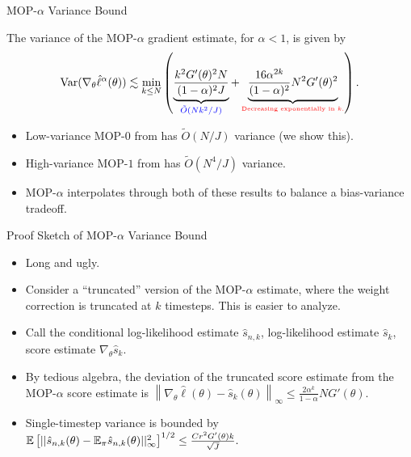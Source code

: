 \documentclass{beamer}
\begin{document}
\begin{frame}{MOP-$\alpha$ Variance Bound}
    \begin{thm}
        The variance of the MOP-$\alpha$ gradient estimate, for $\alpha<1$, is given by
        \pause
        $$\text{Var}(\nabla_\theta \hat\ell^\alpha(\theta)) \lesssim \min_{k\leq N} \left(\underbrace{\frac{k^2G'(\theta)^2N}{(1-\alpha)^2J}}_{\textcolor{blue}{\tilde O(Nk^2/J)}} + \underbrace{\frac{16\alpha^{2k}}{(1-\alpha)^2}N^2G'(\theta)^2}_{\textcolor{red}{\text{\tiny{Decreasing exponentially in $k$.}}}} \right).$$
    \end{thm}
    \pause
    \begin{itemize}
        \item Low-variance MOP-$0$ from \cite{blei2018vsmc} has $\tilde{O}(N/J)$ variance (we show this).\pause
        \item High-variance MOP-$1$ from \cite{poyiadjis11} has $\tilde{O}(N^4/J)$ variance. \pause
        \item MOP-$\alpha$ interpolates through both of these results to balance a bias-variance tradeoff. 
    \end{itemize}
\end{frame}

\begin{frame}{Proof Sketch of MOP-$\alpha$ Variance Bound}
    \begin{itemize}
        \item Long and ugly.\pause
        \item Consider a ``truncated'' version of the MOP-$\alpha$ estimate, where the weight correction is truncated at $k$ timesteps. This is easier to analyze. \pause
        \item Call the conditional log-likelihood estimate $\hat{s}_{n,k}$, log-likelihood estimate $\hat{s}_{k}$, score estimate $\nabla_\theta \hat{s}_{k}$.\pause
        \item By tedious algebra, the deviation of the truncated score estimate from the MOP-$\alpha$ score estimate is $\left\lVert\nabla_\theta\hat\ell(\theta) - \hat s_k(\theta) \right\rVert_\infty \leq  \frac{2\alpha^k}{1-\alpha}NG'(\theta)$.\pause
        \item Single-timestep variance is bounded by $\mathbb{E}\left[||\hat s_{n,k}(\theta) - \mathbb{E}_{\pi}\hat s_{n,k}(\theta)||_\infty^2\right]^{1/2} \leq \frac{Cr^2G'(\theta) k}{\sqrt{J}}.$
    \end{itemize}
\end{frame}
\end{document}
